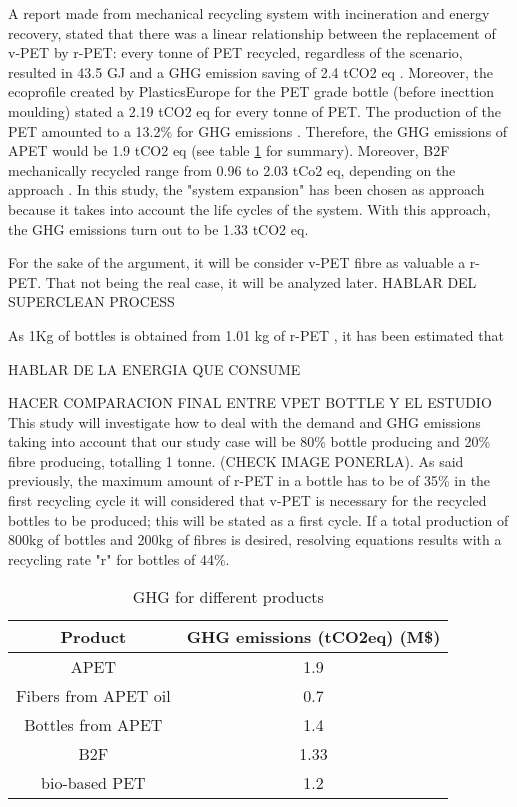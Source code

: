 \documentclass[twoside,a4paper,12pt]{report}
\begin{document}
A report made from mechanical recycling system with incineration and energy recovery, stated that there was a linear relationship between the replacement of v-PET by r-PET: every tonne of PET recycled, regardless of the scenario, resulted in 43.5 GJ and a GHG emission saving of 2.4 tCO2 eq \cite{Shen2011}. Moreover, the ecoprofile created by PlasticsEurope for the PET grade bottle (before inecttion moulding) stated a 2.19 tCO2 eq for every tonne of PET. The production of the PET amounted to a 13.2\% for GHG emissions \cite{PEPETecoprofile}. Therefore, the GHG emissions of APET would be 1.9 tCO2 eq (see table \ref{GHGprod} for summary).  Moreover, B2F mechanically recycled range from 0.96 to 2.03 tCo2 eq, depending on the approach \cite{Shen2010}. In this study, the "system expansion" has been chosen as approach because it takes into account the life cycles of the system. With this approach, the GHG emissions turn out to be 1.33 tCO2 eq.   

For the sake of the argument, it will be consider v-PET fibre as valuable a r-PET. That not being the real case, it will be analyzed later.
HABLAR DEL SUPERCLEAN PROCESS

As 1Kg of bottles is obtained from 1.01 kg of r-PET \cite{Shen2010}, it has been estimated that 

HABLAR DE LA ENERGIA QUE CONSUME 

HACER COMPARACION FINAL ENTRE VPET BOTTLE Y EL ESTUDIO
This study will investigate how to deal with the demand and GHG emissions taking into account that our study case will be 80\% bottle producing and 20\% fibre producing, totalling 1 tonne. (CHECK IMAGE PONERLA). As said previously, the maximum amount of r-PET in a bottle has to be of 35\%  in the first recycling cycle it will considered that v-PET is necessary for the recycled bottles to be produced; this will be stated as a first cycle. If a total production of 800kg of bottles and 200kg of fibres is desired, resolving equations results with a recycling rate "r" for bottles of 44\%.

\begin{table}
\centering
 \begin{tabular}{|c c||} 
 \hline
 Product & GHG emissions (tCO2eq) (M\$) \\  [0.5ex] 
 \hline\hline
 APET & 1.9 \cite{PEPETecoprofile} \\ 
 \hline
 Fibers from APET oil & 0.7 \cite{Shen2011}\\
 \hline
 Bottles from APET & 1.4 \cite{Shen2011}\\
 \hline
 B2F & 1.33 \cite{Shen2010}\\
 \hline
 bio-based PET & 1.2 \cite{Shen2011}\\
 \hline
\end{tabular}
\label{GHGprod}
\caption{GHG for different products}
\end{table}
\end{document}
